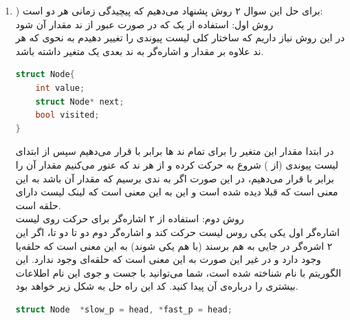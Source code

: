 \documentclass{article}
\begin{document}
\begin{enumerate}
\begin{enumerate}
		\item) برای حل این سوال ۲ روش پشنهاد می‌دهیم که پیچیدگی زمانی هر دو  است:\\
		\lr{**} روش اول: استفاده از یک  که در صورت عبور از ند مقدار آن  شود\\
		در این روش نیاز داریم که ساختار کلی لیست پیوندی را تغییر دهیدم به نحوی که هر ند علاوه بر مقدار و اشاره‌گر به ند بعدی یک متغیر  داشته باشد. 
\begin{latin}
\begin{flushright}				
\begin{lstlisting}[language=C++]
struct Node{
	int value;
	struct Node* next; 
	bool visited;
}
\end{lstlisting}
\end{flushright}								
\end{latin}
در ابتدا مقدار این متغیر را برای تمام ند ها برابر با  قرار می‌دهیم سپس از ابتدای لیست پیوندی (از ) شروع به حرکت کرده و از هر ند که عنور می‌کنیم مقدار  آن را برابر با  قرار می‌دهیم، در این صورت اگر به ندی برسیم که مقدار  آن  باشد به این معنی است که قبلا دیده شده است و این به این معنی است که لینک لیست دارای حلقه است. \\
\lr{**} روش دوم: استفاده از ۲ اشاره‌گر برای حرکت روی لیست\\
اشاره‌گر اول یکی یکی روس لیست حرکت کند و اشاره‌گر دوم دو تا دو تا، اگر این ۲ اشره‌گر در جایی به هم برسند (با هم یکی شوند) به این معنی است که حلقه‌یا وجود دارد و در غیر این صورت به این معنی است که حلقه‌ای وجود ندارد. این الگوریتم با نام  شناخته شده است، شما می‌توانید با جست و جو‌ی این نام اطلاعات بیشتری را درباره‌ی آن پیدا کنید. کد این راه حل به شکل زیر خواهد بود.
\begin{latin}
\begin{flushright}				
\begin{lstlisting}[language=C++]
struct Node  *slow_p = head, *fast_p = head;
  

\end{lstlisting}
\end{flushright}
\end{latin}
\end{enumerate}
\end{enumerate}
\end{document}
